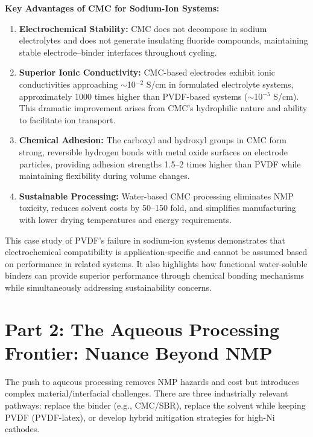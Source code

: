 \documentclass[12pt,a4paper]{article}
\begin{document}
\textbf{Key Advantages of CMC for Sodium-Ion Systems:}
\begin{enumerate}
  \item \textbf{Electrochemical Stability:} CMC does not decompose in sodium electrolytes and does not generate insulating fluoride compounds, maintaining stable electrode--binder interfaces throughout cycling.
  
  \item \textbf{Superior Ionic Conductivity:} CMC-based electrodes exhibit ionic conductivities approaching $\sim$10$^{-2}$ S/cm in formulated electrolyte systems, approximately 1000 times higher than PVDF-based systems ($\sim$10$^{-5}$ S/cm). This dramatic improvement arises from CMC's hydrophilic nature and ability to facilitate ion transport.
  
  \item \textbf{Chemical Adhesion:} The carboxyl and hydroxyl groups in CMC form strong, reversible hydrogen bonds with metal oxide surfaces on electrode particles, providing adhesion strengths 1.5--2 times higher than PVDF while maintaining flexibility during volume changes.
  
  \item \textbf{Sustainable Processing:} Water-based CMC processing eliminates NMP toxicity, reduces solvent costs by 50--150 fold, and simplifies manufacturing with lower drying temperatures and energy requirements.
\end{enumerate}

This case study of PVDF's failure in sodium-ion systems demonstrates that electrochemical compatibility is application-specific and cannot be assumed based on performance in related systems. It also highlights how functional water-soluble binders can provide superior performance through chemical bonding mechanisms while simultaneously addressing sustainability concerns.

\section{Part 2: The Aqueous Processing Frontier: Nuance Beyond NMP}

The push to aqueous processing removes NMP hazards and cost but introduces complex material/interfacial challenges. There are three industrially relevant pathways: replace the binder (e.g., CMC/SBR), replace the solvent while keeping PVDF (PVDF-latex), or develop hybrid mitigation strategies for high-Ni cathodes.\citep{ref1}
\end{document}
